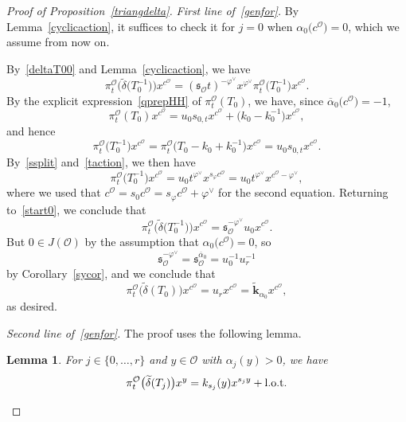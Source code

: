 \documentclass[pdftex]{sigma}
\numberwithin{equation}{section}
\newtheorem{Lemma}[Theorem]{Lemma}
\begin{document}
\begin{proof}[Proof of Proposition~\ref{triangdelta}]
{\it First line of~\eqref{genfor}.} By Lemma~\ref{cyclicaction}, it suffices to check it for $j=0$ when $\alpha_0\bigl(c^\mathcal{O}\bigr)=0$,
which we assume from now on.

By~\eqref{deltaT00} and Lemma~\ref{cyclicaction}, we have
\begin{equation}\label{start0}
\pi_{t}^\mathcal{O}\bigl(\widetilde{\delta}\bigl(T_0^{-1}\bigr)\bigr)x^{c^\mathcal{O}} =(\mathfrak{s}_\mathcal{O}t)^{-\varphi^\vee}x^{\varphi^\vee}\pi_{t}^\mathcal{O}\bigl(T_0^{-1}\bigr)x^{c^\mathcal{O}}.
\end{equation}
By the explicit expression~\eqref{qprepHH} of $\pi_{t}^\mathcal{O}(T_0)$, we have, since $\overline{\alpha}_0\bigl(c^\mathcal{O}\bigr)=-1$,
\[
\pi_{t}^\mathcal{O}(T_0)x^{c^\mathcal{O}}=u_0s_{0,t}x^{c^\mathcal{O}}+\bigl(k_0-k_0^{-1}\bigr)x^{c^\mathcal{O}},
\]
and hence
\begin{equation*}%
\pi_{t}^\mathcal{O}\bigl(T_0^{-1}\bigr)x^{c^\mathcal{O}}=\pi_{t}^\mathcal{O}\bigl(T_0-k_0+k_0^{-1}\bigr)x^{c^\mathcal{O}}=u_0s_{0,t}x^{c^\mathcal{O}}.
\end{equation*}
By~\eqref{ssplit} and~\eqref{taction}, we then have
\[
\pi_{t}^\mathcal{O}\bigl(T_0^{-1}\bigr)x^{c^\mathcal{O}}=u_0t^{\varphi^\vee}x^{s_\varphi c^\mathcal{O}}=u_0t^{\varphi^\vee}x^{c^\mathcal{O}-\varphi^\vee},
\]
where we used that $c^\mathcal{O}=s_0c^\mathcal{O}=s_\varphi c^\mathcal{O}+\varphi^\vee$ for the second equation.
Returning to~\eqref{start0}, we conclude that
\[
\pi_{t}^\mathcal{O}\bigl(\widetilde{\delta}\bigl(T_0^{-1}\bigr)\bigr)x^{c^\mathcal{O}}=
\mathfrak{s}_\mathcal{O}^{-\varphi^\vee}u_0x^{c^\mathcal{O}}.
\]
But $0\in J(\mathcal{O})$ by the assumption that $\alpha_0\bigl(c^\mathcal{O}\bigr)=0$, so
\[
\mathfrak{s}_\mathcal{O}^{-\varphi^\vee}=\mathfrak{s}_\mathcal{O}^{\overline{\alpha}_0}=u_0^{-1}u_r^{-1}
\]
by Corollary~\ref{sycor}, and we conclude that
\[
\pi_{t}^\mathcal{O}\bigl(\widetilde{\delta}(T_0)\bigr)x^{c^\mathcal{O}}=u_rx^{c^\mathcal{O}}=\widetilde{\mathbf{k}}_{\alpha_0}x^{c^\mathcal{O}},
\]
as desired.

{\it Second line of~\eqref{genfor}.} The proof uses the following lemma.

\begin{Lemma}\label{twtinvlemma}
For $j\in\{0,\dots,r\}$ and $y\in\mathcal{O}$ with $\alpha_j(y)>0$, we have
\begin{equation*}%
\pi_{t}^\mathcal{O}\bigl(\widetilde{\delta}(T_j)\bigr)x^y=k_{s_j}(y)x^{s_jy}+ {\rm l.o.t.}
\end{equation*}
\end{Lemma}


\end{proof}
\end{document}
